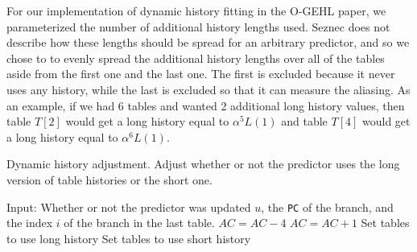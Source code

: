 For our implementation of dynamic history fitting in the O-GEHL paper, we parameterized the number of additional history lengths used.  Seznec does not describe how these lengths should be spread for an arbitrary predictor, and so we chose to to evenly spread the additional history lengths over all of the tables aside from the first one and the last one.  The first is excluded because it never uses any history, while the last is excluded so that it can measure the aliasing.  As an example, if we had 6 tables and wanted 2 additional long history values, then table $T[2]$ would get a long history equal to $\alpha^{5}L(1)$ and table $T[4]$ would get a long history equal to $\alpha^{6}L(1)$.

\begin{algorithm}[h]
  \caption{Dynamic history adjustment.  Adjust whether or not the predictor uses the long version of table histories or the short one.}
  \label{alg:dynH}
  \begin{algorithmic}[1]

    \STATE Input: Whether or not the predictor was updated $u$, the \texttt{PC} of the branch, and the index $i$ of the branch in the last table.
    \STATE
        \STATE $AC = AC - 4$
      \ELSE
        \STATE $AC = AC + 1$
      \ENDIF
        \STATE Set tables to use long history
        \STATE Set tables to use short history
      \ENDIF
    \ENDIF
  \end{algorithmic}
\end{algorithm}
